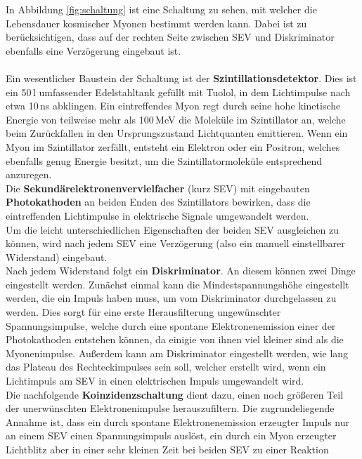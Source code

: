     In Abbildung \ref{fig:schaltung} ist eine Schaltung zu sehen,
    mit welcher die Lebensdauer kosmischer Myonen bestimmt werden kann.
    Dabei ist zu berücksichtigen, dass auf der rechten Seite
    zwischen SEV und Diskriminator ebenfalls eine Verzögerung eingebaut ist.\\
    \ \\
    Ein wesentlicher Baustein der Schaltung ist der \textbf{Szintillationsdetektor}.
    Dies ist ein 50\,l umfassender Edelstahltank gefüllt mit Tuolol,
    in dem Lichtimpulse nach etwa 10\,ns abklingen.
    Ein eintreffendes Myon regt durch seine hohe kinetische Energie von
    teilweise mehr als 100\,MeV die Moleküle im Szintillator an, welche
    beim Zurückfallen in den Ursprungszustand Lichtquanten emittieren.
    Wenn ein Myon im Szintillator zerfällt, entsteht ein Elektron oder ein
    Positron, welches ebenfalls genug Energie besitzt, um die Szintillatormoleküle
    entsprechend anzuregen. \\
    Die \textbf{Sekundärelektronenvervielfacher} (kurz SEV) mit eingebauten
    \textbf{Photokathoden} an beiden Enden des Szintillators bewirken,
    dass die eintreffenden Lichtimpulse in elektrische Signale umgewandelt
    werden.\\
    Um die leicht unterschiedlichen Eigenschaften der beiden SEV ausgleichen
    zu können, wird nach jedem SEV eine Verzögerung (also ein manuell einstellbarer
    Widerstand) eingebaut. \\
    Nach jedem Widerstand folgt ein \textbf{Diskriminator}. An diesem können zwei
    Dinge eingestellt werden. Zunächst einmal kann die Mindestspannungshöhe
    eingestellt werden, die ein Impuls haben muss, um vom Diskriminator
    durchgelassen zu werden. Dies sorgt für eine erste Herausfilterung
    ungewünschter Spannungsimpulse, welche durch eine spontane Elektronenemission
    einer der Photokathoden entstehen können, da einigie von ihnen viel kleiner
    sind als die Myonenimpulse. Außerdem kann am Diskriminator
    eingestellt werden, wie lang das Plateau des Rechteckimpulses sein
    soll, welcher erstellt wird, wenn ein Lichtimpuls am SEV in einen elektrischen
    Impuls umgewandelt wird.\\
    Die nachfolgende \textbf{Koinzidenzschaltung} dient dazu, einen noch größeren Teil
    der unerwünschten Elektronenimpulse herauszufiltern. Die zugrundeliegende
    Annahme ist, dass ein durch spontane Elektronenemission erzeugter Impuls
    nur an einem SEV einen Spannungsimpuls auslöst, ein durch ein Myon erzeugter
    Lichtblitz aber in einer sehr kleinen Zeit bei beiden SEV zu einer Reaktion
